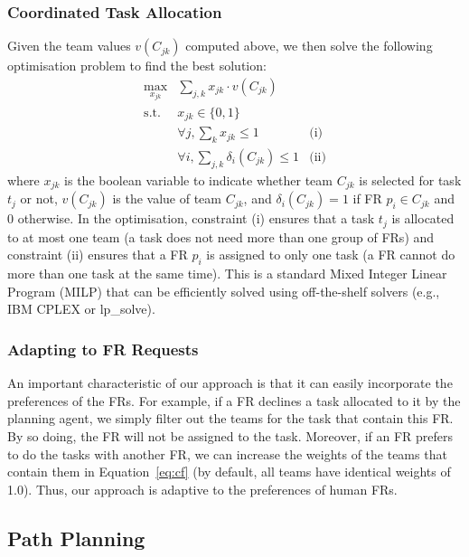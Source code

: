 \subsubsection{Coordinated Task Allocation}
\noindent Given the team values $v(C_{jk})$ computed above, we then solve the
following optimisation problem to find the best solution:
\begin{equation}
  \begin{array}{lll}
    \max\limits_{x_{jk}} & \sum_{j, k} x_{jk} \cdot v(C_{jk}) & \\[2pt]
    \mbox{s.t.} & x_{jk} \in \{0, 1\} & \\[2pt]
    & \forall j, \sum_{k} x_{jk} \leq 1 & \mbox{(i)} \\[2pt]
    & \forall i, \sum_{j, k} \delta_i(C_{jk}) \leq 1 & \mbox{(ii)}
  \end{array}
  \label{eq:cf}
\end{equation}
where $x_{jk}$ is the boolean variable to indicate whether team
$C_{jk}$ is selected for task $t_j$ or not, $v(C_{jk})$ is the value of team $C_{jk}$, and $\delta_i(C_{jk}) =
1$ if FR $p_i\in C_{jk}$ and 0 otherwise. In the
optimisation, constraint (i) ensures that a task $t_j$ is allocated
to at most one team (a task does not need more than one group of
FRs) and constraint (ii) ensures that a FR $p_i$ is
assigned to only one task (a FR cannot do more than one task
at the same time). This is a standard Mixed Integer Linear Program
(MILP) that can be efficiently solved  using off-the-shelf solvers (e.g., IBM CPLEX or lp\_solve).

\subsubsection{Adapting to FR Requests}\label{sec:adaptive}
\noindent An important characteristic of our approach is that it can easily
incorporate the preferences of the FRs. For example, if a
FR declines a task allocated to it by the planning agent, we
simply filter out the teams for the task that contain this
FR. By so doing, the FR will not be assigned to the
task. Moreover, if an FR prefers to do the tasks with another
FR, we can increase the weights of the teams that
contain them in Equation~\ref{eq:cf} (by default, all teams
have identical weights of 1.0). Thus, our approach is adaptive to the
 preferences of human FRs.

\subsection{Path Planning}
\label{sec:pathplanning}

